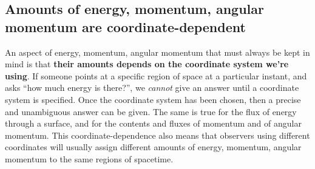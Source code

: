 \documentclass[a4paper,12pt,%
onecolumn,oneside,%
british%
]{memoir}
\renewcommand*{\|}[1][]{\nonscript\:#1\vert\nonscript\:\mathopen{}}
\begin{document}
\subsection{Amounts of energy, momentum, angular momentum are coordinate-dependent}
\label{sec:energy_momentum_angmomentum_coords}


An aspect of energy, momentum, angular momentum that must always be kept in mind is that \textbf{their amounts depends on the coordinate system we're using}. If someone points at a specific region of space at a particular instant, and asks \enquote{how much energy is there?}, we \emph{cannot} give an answer until a coordinate system is specified. Once the coordinate system has been chosen, then a precise and unambiguous answer can be given. The same is true for the flux of energy through a surface, and for the contents and fluxes of momentum and of angular momentum. This coordinate-dependence also means that observers using different coordinates will usually assign different amounts of energy, momentum, angular momentum to the same regions of spacetime.
\end{document}
